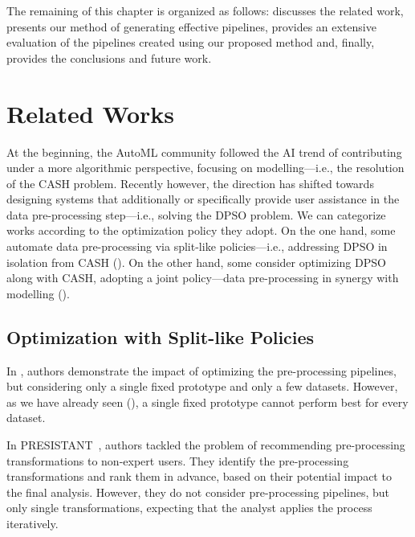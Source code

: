 The remaining of this chapter is organized as follows:
 discusses the related work,
 presents our method of generating effective pipelines,
 provides an extensive evaluation of the pipelines created using our proposed method and, finally,  provides the conclusions and future work.


\section{Related Works}
\label{effective-sec:related-work}
At the beginning, the AutoML community followed the AI trend of contributing under a more algorithmic perspective, focusing on modelling---i.e., the resolution of the CASH problem.
Recently however, the direction has shifted towards designing systems that additionally or specifically provide user assistance in the data pre-processing step---i.e., solving the DPSO problem.
We can categorize works according to the optimization policy \cite{quemy2019data} they adopt.
On the one hand, some automate data pre-processing via split-like policies---i.e., addressing DPSO in isolation from CASH ().
On the other hand, some consider optimizing DPSO along with CASH, adopting a joint policy---data pre-processing in synergy with modelling ().

\subsection{Optimization with Split-like Policies}
\label{effective-ssec:dpso}

In \cite{Quemy20InfSystems}, authors demonstrate the impact of optimizing the pre-processing pipelines, but considering only a single fixed prototype and only a few datasets.
However, as we have already seen (), a single fixed prototype cannot perform best for every dataset.

In PRESISTANT~\cite{presistant18CSI,presistant18CAISE,presistant19DKE}, authors tackled the problem of recommending pre-processing transformations to non-expert users.
They identify the pre-processing transformations and rank them in advance, based on their potential impact to the final analysis.
However, they do not consider pre-processing pipelines, but only single transformations, expecting that the analyst applies the process iteratively.

